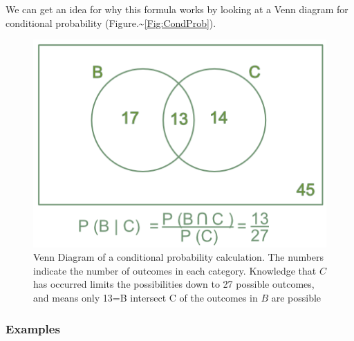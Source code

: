 \documentclass[
]{book}
\theoremstyle{definition}
\theoremstyle{definition}
\theoremstyle{definition}
\theoremstyle{definition}
\theoremstyle{remark}
\begin{document}
We can get an idea for why this formula works by looking at a Venn diagram for conditional probability (Figure.\textasciitilde{}\ref{Fig:CondProb}).

\begin{figure}
\includegraphics[width=0.5\linewidth]{P361_z1} \caption{Venn Diagram of a conditional probability calculation. The numbers indicate the number of outcomes in each category. Knowledge that $C$ has occurred limits the possibilities down to 27 possible outcomes, and means only 13=B intersect C of the outcomes in $B$ are possible}\label{fig:addCondDiagram}
\end{figure}

\hypertarget{examples}{%
\subsubsection{Examples}\label{examples}}
\end{document}
